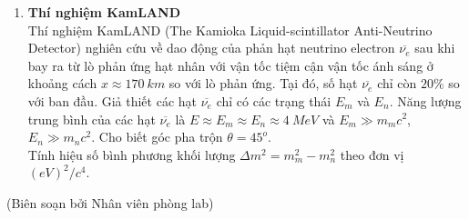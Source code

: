 \begin{enumerate}
\item \textbf{Thí nghiệm KamLAND}\\
Thí nghiệm KamLAND (The Kamioka Liquid-scintillator Anti-Neutrino Detector) nghiên cứu về dao động của phản hạt neutrino electron $\overline{\nu_e}$ sau khi bay ra từ lò phản ứng hạt nhân với vận tốc tiệm cận vận tốc ánh sáng ở khoảng cách $x \approx 170 \ \si{km}$ so với lò phản ứng. Tại đó, số hạt $\overline{\nu_e}$ chỉ còn $20\%$ so với ban đầu. Giả thiết các hạt $\overline{\nu_e}$ chỉ có các trạng thái $E_m$ và $E_n$. Năng lượng trung bình của các hạt $\overline{\nu_e}$ là $E \approx E_m \approx E_n \approx 4 \ \si{MeV}$ và $E_m \gg m_m c^2$, $E_n \gg m_n c^2$. Cho biết góc pha trộn $\theta = 45^o$. \\
Tính hiệu số bình phương khối lượng $\Delta m^2 = m_m^2 - m_n^2$ theo đơn vị $\si{(eV)^2/c^4}$.
\end{enumerate}

\begin{flushright}
    (Biên soạn bởi Nhân viên phòng lab)
\end{flushright}